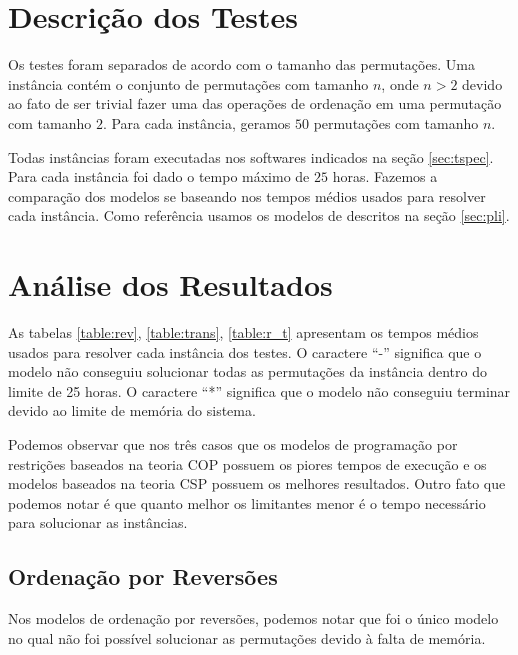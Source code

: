 \section{Descrição dos Testes}
\label{sec:testes}
Os testes foram separados de acordo com o tamanho das
permutações. Uma instância contém o conjunto de permutações com
tamanho $n$, onde $n > 2$ devido ao fato de ser trivial fazer uma das
operações de ordenação em uma permutação com tamanho $2$. Para cada
instância, geramos $50$ permutações com tamanho $n$.

Todas instâncias foram executadas nos softwares indicados na
seção \ref{sec:tspec}. Para cada instância foi dado o tempo máximo de
$25$ horas. Fazemos a comparação dos modelos se baseando nos tempos
médios usados para resolver cada instância. Como referência usamos os
modelos de \pli{} descritos na seção \ref{sec:pli}.

\section{Análise dos Resultados}
\label{sec:analise}
As tabelas \ref{table:rev}, \ref{table:trans}, \ref{table:r_t}
apresentam os tempos médios usados para resolver cada instância dos
testes. O caractere ``-'' significa que o modelo não conseguiu
solucionar todas as permutações da instância dentro do limite de 25
horas. O caractere ``*'' significa que o modelo não conseguiu terminar
devido ao limite de memória do sistema.

Podemos observar que nos três casos que os modelos de programação por
restrições baseados na teoria COP possuem os piores tempos de execução
e os modelos baseados na teoria CSP possuem os melhores
resultados. Outro fato que podemos notar é que quanto melhor os
limitantes menor é o tempo necessário para solucionar as instâncias.





\subsection{Ordenação por Reversões}
\label{subsec:analise_rev}
Nos modelos de ordenação por reversões, podemos notar que foi o único
modelo no qual não foi possível solucionar as permutações devido à
falta de memória.




